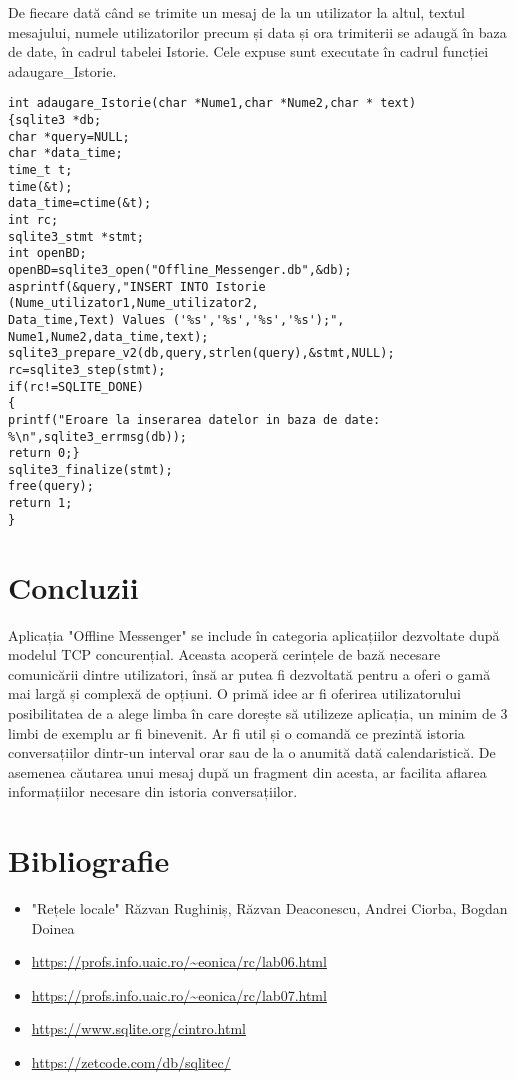 \documentclass{article}
\begin{document}
De fiecare dată când se trimite un mesaj de la un utilizator la altul, textul mesajului, numele utilizatorilor precum și data și ora trimiterii se adaugă în baza de date, în cadrul tabelei Istorie. Cele expuse sunt executate în cadrul funcției adaugare\_Istorie.\\

\begin{lstlisting}
int adaugare_Istorie(char *Nume1,char *Nume2,char * text)
{sqlite3 *db;
char *query=NULL;
char *data_time;
time_t t;
time(&t);
data_time=ctime(&t);
int rc;
sqlite3_stmt *stmt;
int openBD;
openBD=sqlite3_open("Offline_Messenger.db",&db);
asprintf(&query,"INSERT INTO Istorie 
(Nume_utilizator1,Nume_utilizator2,
Data_time,Text) Values ('%s','%s','%s','%s');", 
Nume1,Nume2,data_time,text);
sqlite3_prepare_v2(db,query,strlen(query),&stmt,NULL);
rc=sqlite3_step(stmt);
if(rc!=SQLITE_DONE)
{
printf("Eroare la inserarea datelor in baza de date: 
%\n",sqlite3_errmsg(db));
return 0;}
sqlite3_finalize(stmt);
free(query);
return 1;
}
\end{lstlisting}
\section{Concluzii}
Aplicația "Offline Messenger" se include în categoria aplicațiilor dezvoltate după modelul TCP concurențial. Aceasta acoperă cerințele de bază necesare comunicării dintre utilizatori, însă ar putea fi dezvoltată pentru a oferi o gamă mai largă și complexă de opțiuni. O primă idee ar fi oferirea utilizatorului posibilitatea de a alege limba în care dorește să utilizeze aplicația, un minim de 3 limbi de exemplu ar fi binevenit. Ar fi util și o comandă ce prezintă istoria conversațiilor dintr-un interval orar sau de la o anumită dată calendaristică. De asemenea căutarea unui mesaj după un fragment din acesta, ar facilita aflarea informațiilor necesare din istoria conversațiilor.
\section{Bibliografie}
\begin{itemize}
	\item "Rețele locale" Răzvan Rughiniș, Răzvan Deaconescu, Andrei Ciorba, Bogdan Doinea
	\item \url {https://profs.info.uaic.ro/~eonica/rc/lab06.html}
	\item \url {https://profs.info.uaic.ro/~eonica/rc/lab07.html}
	\item \url {https://www.sqlite.org/cintro.html}
	\item \url {https://zetcode.com/db/sqlitec/}
\end{itemize}
\end{document}

